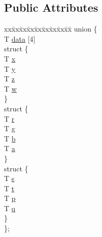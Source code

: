 \subsection*{Public Attributes}
\begin{DoxyCompactItemize}
\item 
\begin{tabbing}
xx\=xx\=xx\=xx\=xx\=xx\=xx\=xx\=xx\=\kill
union \{\\
\>T \hyperlink{structNSVec4_a4b4e4379560f2c2fbb02121eadd50d65}{data} \mbox{[}4\mbox{]}\\
\>struct \{\\
\>\>T \hyperlink{structNSVec4_a938b634d36203d308a4da3dcf27edec2}{x}\\
\>\>T \hyperlink{structNSVec4_a668c9fe6a39b8d0ef4db8f2e935e1662}{y}\\
\>\>T \hyperlink{structNSVec4_a9d570cf5c0cf44a6e86387de0ff59d7c}{z}\\
\>\>T \hyperlink{structNSVec4_aa8d4194ec57678f79e9cab21441074ee}{w}\\
\>\} \\
\>struct \{\\
\>\>T \hyperlink{structNSVec4_afa2b1cf8a7a43876ca3b70bf74d25f39}{r}\\
\>\>T \hyperlink{structNSVec4_a6a4f6a36a219e1b2d56828fb699109f7}{g}\\
\>\>T \hyperlink{structNSVec4_ac64c9259d63efac5f6b85a39d784cfb1}{b}\\
\>\>T \hyperlink{structNSVec4_aeb0de863015f3b7af2ad5736cd075860}{a}\\
\>\} \\
\>struct \{\\
\>\>T \hyperlink{structNSVec4_a560e89cd6a4d927bc6bee5c4581d3462}{s}\\
\>\>T \hyperlink{structNSVec4_a84aa4b91426f2ede9a22ebc01e4eaeff}{t}\\
\>\>T \hyperlink{structNSVec4_a50137268b80b5a2be6c5a4c57c7c5712}{p}\\
\>\>T \hyperlink{structNSVec4_a28bbe13de9699d2eefb69f3f5ac214f5}{q}\\
\>\} \\
\}; \\

\end{tabbing}\end{DoxyCompactItemize}



